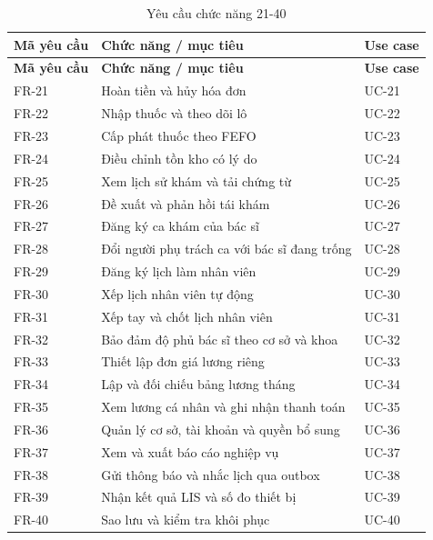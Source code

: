 {\small\setlength{\tabcolsep}{3pt}\renewcommand{\arraystretch}{1.12}
\begin{longtable}{@{}L{\textwidth-1.68pt\relax} L{\textwidth-8.4pt\relax} L{\textwidth-1.92pt\relax}@{}}
\caption{Yêu cầu chức năng 21-40}\\
\toprule
\textbf{Mã yêu cầu} & \textbf{Chức năng /\allowbreak{} mục tiêu} & \textbf{Use case}\\\midrule
\endfirsthead
\toprule
\textbf{Mã yêu cầu} & \textbf{Chức năng /\allowbreak{} mục tiêu} & \textbf{Use case}\\\midrule
\endhead
\bottomrule\endlastfoot
FR-21 & Hoàn tiền và hủy hóa đơn & UC-21\\[3pt]
FR-22 & Nhập thuốc và theo dõi lô & UC-22\\[3pt]
FR-23 & Cấp phát thuốc theo FEFO & UC-23\\[3pt]
FR-24 & Điều chỉnh tồn kho có lý do & UC-24\\[3pt]
FR-25 & Xem lịch sử khám và tải chứng từ & UC-25\\[3pt]
FR-26 & Đề xuất và phản hồi tái khám & UC-26\\[3pt]
FR-27 & Đăng ký ca khám của bác sĩ & UC-27\\[3pt]
FR-28 & Đổi người phụ trách ca với bác sĩ đang trống & UC-28\\[3pt]
FR-29 & Đăng ký lịch làm nhân viên & UC-29\\[3pt]
FR-30 & Xếp lịch nhân viên tự động & UC-30\\[3pt]
FR-31 & Xếp tay và chốt lịch nhân viên & UC-31\\[3pt]
FR-32 & Bảo đảm độ phủ bác sĩ theo cơ sở và khoa & UC-32\\[3pt]
FR-33 & Thiết lập đơn giá lương riêng & UC-33\\[3pt]
FR-34 & Lập và đối chiếu bảng lương tháng & UC-34\\[3pt]
FR-35 & Xem lương cá nhân và ghi nhận thanh toán & UC-35\\[3pt]
FR-36 & Quản lý cơ sở, tài khoản và quyền bổ sung & UC-36\\[3pt]
FR-37 & Xem và xuất báo cáo nghiệp vụ & UC-37\\[3pt]
FR-38 & Gửi thông báo và nhắc lịch qua outbox & UC-38\\[3pt]
FR-39 & Nhận kết quả LIS và số đo thiết bị & UC-39\\[3pt]
FR-40 & Sao lưu và kiểm tra khôi phục & UC-40\\[3pt]
\end{longtable}}
\clearpage

